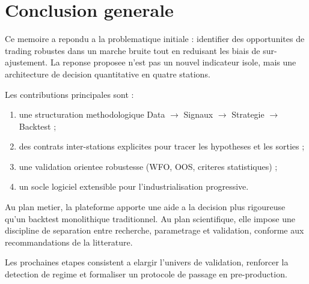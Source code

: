 \chapter{Conclusion generale}

Ce memoire a repondu a la problematique initiale : identifier des opportunites
de trading robustes dans un marche bruite tout en reduisant les biais de
sur-ajustement. La reponse proposee n'est pas un nouvel indicateur isole, mais
une architecture de decision quantitative en quatre stations.

Les contributions principales sont :
\begin{enumerate}
\item une structuration methodologique Data $\rightarrow$ Signaux
$\rightarrow$ Strategie $\rightarrow$ Backtest ;
\item des contrats inter-stations explicites pour tracer les hypotheses et les
sorties ;
\item une validation orientee robustesse (WFO, OOS, criteres statistiques) ;
\item un socle logiciel extensible pour l'industrialisation progressive.
\end{enumerate}

Au plan metier, la plateforme apporte une aide a la decision plus rigoureuse
qu'un backtest monolithique traditionnel. Au plan scientifique, elle impose une
discipline de separation entre recherche, parametrage et validation, conforme aux
recommandations de la litterature.

Les prochaines etapes consistent a elargir l'univers de validation, renforcer la
detection de regime et formaliser un protocole de passage en pre-production.


